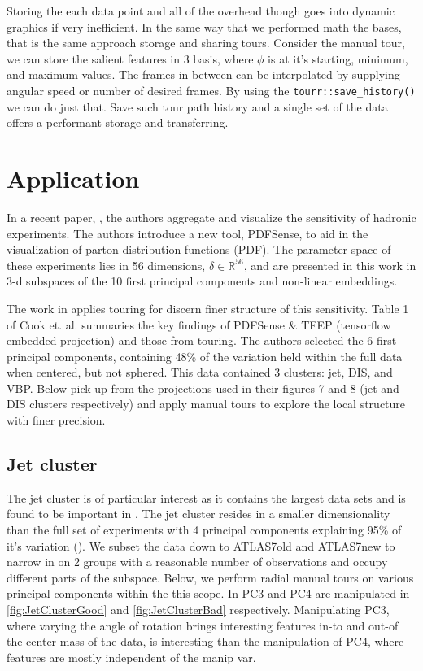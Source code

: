 \documentclass{monashthesis}
\begin{document}
Storing the each data point and all of the overhead though goes into
dynamic graphics if very inefficient. In the same way that we performed
math the bases, that is the same approach storage and sharing tours.
Consider the manual tour, we can store the salient features in 3 basis,
where \(\phi\) is at it's starting, minimum, and maximum values. The
frames in between can be interpolated by supplying angular speed or
number of desired frames. By using the \texttt{tourr::save\_history()}
we can do just that. Save such tour path history and a single set of the
data offers a performant storage and transferring.

\section{Application}\label{sec:application}

In a recent paper, \textcite{wang_visualizing_2018}, the authors
aggregate and visualize the sensitivity of hadronic experiments. The
authors introduce a new tool, PDFSense, to aid in the visualization of
parton distribution functions (PDF). The parameter-space of these
experiments lies in 56 dimensions, \(\delta \in \mathbb{R}^{56}\), and
are presented in this work in 3-d subspaces of the 10 first principal
components and non-linear embeddings.

The work in \textcite{cook_dynamical_2018} applies touring for discern
finer structure of this sensitivity. Table 1 of Cook et. al. summaries
the key findings of PDFSense \& TFEP (tensorflow embedded projection)
and those from touring. The authors selected the 6 first principal
components, containing 48\% of the variation held within the full data
when centered, but not sphered. This data contained 3 clusters: jet,
DIS, and VBP. Below pick up from the projections used in their figures 7
and 8 (jet and DIS clusters respectively) and apply manual tours to
explore the local structure with finer precision.

\subsection{Jet cluster}\label{jet-cluster}

The jet cluster is of particular interest as it contains the largest
data sets and is found to be important in
\textcite{wang_visualizing_2018}. The jet cluster resides in a smaller
dimensionality than the full set of experiments with 4 principal
components explaining 95\% of it's variation
(\textcite{cook_dynamical_2018}). We subset the data down to ATLAS7old
and ATLAS7new to narrow in on 2 groups with a reasonable number of
observations and occupy different parts of the subspace. Below, we
perform radial manual tours on various principal components within the
this scope. In PC3 and PC4 are manipulated in \ref{fig:JetClusterGood}
and \ref{fig:JetClusterBad} respectively. Manipulating PC3, where
varying the angle of rotation brings interesting features in-to and
out-of the center mass of the data, is interesting than the manipulation
of PC4, where features are mostly independent of the manip var.
\end{document}
